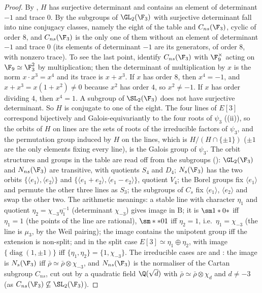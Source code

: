 \begin{proof}
By , $H$ has surjective determinant and contains an element of determinant $-1$ and trace $0$. By 
the subgroups of $\GL_2(\F_3)$ with surjective determinant fall into nine conjugacy classes, namely the eight of the table and $C_{ns}(\F_3)$, cyclic of
order $8$, and $C_{ns}(\F_3)$ is the only one of them without an element of determinant $-1$ and trace $0$ (its elements of determinant $-1$ are its
generators, of order $8$, with nonzero trace). To see the last point, identify $C_{ns}(\F_3)$ with $\F_9^\times$ acting on $\F_9\simeq\F_3^2$ by multiplication; then the
determinant of multiplication by $x$ is the norm $x\cdot x^3=x^4$ and its trace is $x+x^3$. If $x$ has order $8$, then $x^4=-1$, and $x+x^3=x(1+x^2)\ne0$
because $x^2$ has order $4$, so $x^2\ne-1$. If $x$ has order dividing $4$, then $x^4=1$. A subgroup of $\SL_2(\F_3)$ does not have surjective determinant. So $H$ is conjugate to one of the
eight. The four lines of $E[3]$ correspond bijectively and Galois-equivariantly to the four roots of $\psi_3$ ((ii)), so
the orbits of $H$ on lines are the sets of roots of the irreducible factors of $\psi_3$, and the permutation group induced by $H$ on the lines, which is
$H/(H\cap\{\pm1\})$ ($\pm1$ are the only elements fixing every line), is the Galois group of $\psi_3$. The orbit structures and groups in the table are
read off from the subgroups (): $\GL_2(\F_3)$ and $N_{ns}(\F_3)$ are transitive, with quotients $S_4$ and $D_4$; $N_s(\F_3)$ has the two orbits
$\{\langle e_1\rangle,\langle e_2\rangle\}$ and $\{\langle e_1+e_2\rangle,\langle e_1-e_2\rangle\}$, quotient $V_4$; the Borel groups fix $\langle e_1\rangle$ and permute the other three lines
as $S_3$; the subgroups of $C_s$ fix $\langle e_1\rangle$, $\langle e_2\rangle$ and swap the other two. The arithmetic meanings: a stable line with character $\eta_1$ and
quotient $\eta_2=\chi_{-3}\eta_1^{-1}$ (determinant $\chi_{-3}$) gives image in $\mathrm B$; it is $\sm1*0*$ iff $\eta_1=1$ (the points of the line are rational), $\sm**01$ iff
$\eta_2=1$, i.e.\ $\eta_1=\chi_{-3}$ (the line is $\mu_3$, by the Weil pairing); the image contains the unipotent group iff the extension is non-split; and in
the split case $E[3]\simeq\eta_1\oplus\eta_2$, with image $\{\operatorname{diag}(1,\pm1)\}$ iff $\{\eta_1,\eta_2\}=\{1,\chi_{-3}\}$. The irreducible cases are 
and : the image is $N_s(\F_3)$ iff $\bar\rho\simeq\bar\rho\otimes\chi_{-3}$, and $N_{ns}(\F_3)$ is the normaliser of the Cartan subgroup $C_{ns}$, cut out
by a quadratic field $\Q(\sqrt d)$ with $\bar\rho\simeq\bar\rho\otimes\chi_d$ and $d\ne-3$ (as $C_{ns}(\F_3)\not\subseteq\SL_2(\F_3)$).
\end{proof}

